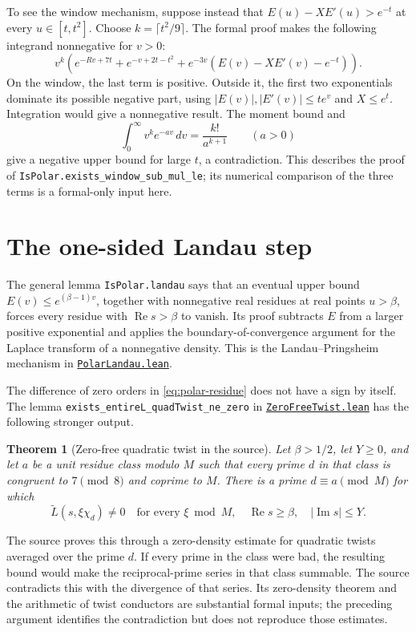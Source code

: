 \documentclass[11pt,oneside,openany]{amsbook}
\newtheorem{theorem}{Theorem}[section]
\theoremstyle{remark}
\numberwithin{equation}{section}
\newcommand{\re}{\operatorname{Re}}
\newcommand{\ghroot}{https://github.com/lsernau/grh-lean/blob/}
\newcommand{\ghrev}{72fead102f663d5c7a407964a13dc0cf9d977207}
\newcommand{\leanfile}[2]{%
  \href{\ghroot\ghrev/grh-compact/src/#1}{\nolinkurl{#2}}}
\begin{document}
To see the window mechanism, suppose instead that
$E(u)-XE'(u)>e^{-t}$ at every $u\in[t,t^2]$.
Choose $k=\lceil t^2/9\rceil$. The formal proof makes
the following integrand nonnegative for $v>0$:
\begin{equation}
\label{eq:window-integrand}
v^k\left(e^{-Rv+7t}+e^{-v+2t-t^2}
  +e^{-3v}(E(v)-XE'(v)-e^{-t})\right).
\end{equation}
On the window, the last term is positive. Outside it,
the first two exponentials dominate its possible negative
part, using $|E(v)|,|E'(v)|\le te^v$ and $X\le e^t$.
Integration would give a nonnegative result. The moment
bound and
\begin{equation}
\label{eq:laplace-power}
\int_0^\infty v^k e^{-av}\,dv=\frac{k!}{a^{k+1}}
\qquad(a>0)
\end{equation}
give a negative upper bound for large $t$, a contradiction.
This describes the proof of
\texttt{IsPolar.exists\_window\_sub\_mul\_le}; its
numerical comparison of the three terms is a formal-only
input here.

\section{The one-sided Landau step}
\label{sec:landau-detail}
The general lemma \texttt{IsPolar.landau} says that an
eventual upper bound $E(v)\le e^{(\beta-1)v}$, together
with nonnegative real residues at real points $u>\beta$,
forces every residue with $\re s>\beta$ to vanish.
Its proof subtracts $E$ from a larger positive exponential
and applies the boundary-of-convergence argument for the
Laplace transform of a nonnegative density. This is the
Landau--Pringsheim mechanism in
\leanfile{Lib/Analytic/Landau/PolarLandau.lean}%
{PolarLandau.lean}.

The difference of zero orders in \eqref{eq:polar-residue}
does not have a sign by itself. The lemma
\texttt{exists\_entireL\_quadTwist\_ne\_zero} in
\leanfile{Lib/Analytic/QuadraticTwist/ZeroFreeTwist.lean}%
{ZeroFreeTwist.lean} has the following stronger output.
\begin{theorem}[Zero-free quadratic twist in the source]
\label{thm:zero-free-twist}
Let $\beta>1/2$, let $Y\ge0$, and let $a$ be a unit
residue class modulo $M$ such that every prime $d$ in
that class is congruent to $7\pmod8$ and coprime to
$M$. There is a prime $d\equiv a\pmod M$ for which
\[
\widetilde L(s,\xi\chi_d)\ne0
\quad\text{for every }\xi\bmod M,
\quad\re s\ge\beta,
\quad|\operatorname{Im}s|\le Y.
\]
\end{theorem}
The source proves this through a zero-density estimate
for quadratic twists averaged over the prime $d$.
If every prime in the class were bad, the resulting
bound would make the reciprocal-prime series in that
class summable. The source contradicts this with the
divergence of that series. Its zero-density theorem and
the arithmetic of twist conductors are substantial
formal inputs; the preceding argument identifies the
contradiction but does not reproduce those estimates.
\end{document}
